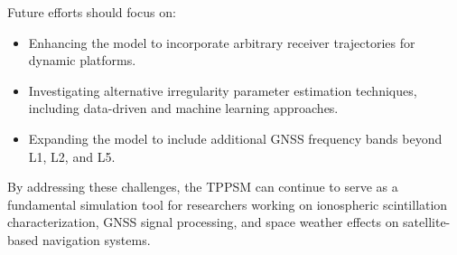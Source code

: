 Future efforts should focus on:
\begin{itemize} \item Enhancing the model to incorporate arbitrary receiver trajectories for dynamic platforms.
\item Investigating alternative irregularity parameter estimation techniques, including data-driven and machine learning approaches.
\item Expanding the model to include additional GNSS frequency bands beyond L1, L2, and L5.
\end{itemize}

By addressing these challenges, the TPPSM can continue to serve as a fundamental simulation tool for researchers working on ionospheric scintillation characterization, GNSS signal processing, and space weather effects on satellite-based navigation systems.